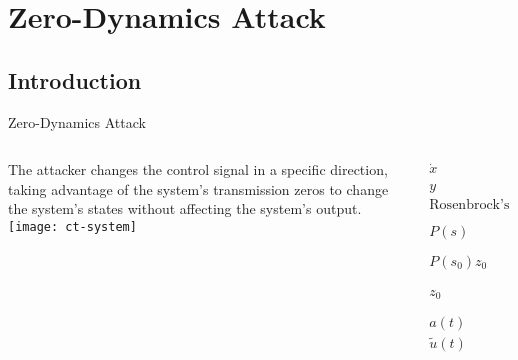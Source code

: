 
\section{Zero-Dynamics Attack}%
\label{sec:zda}

\subsection{Introduction}%
\label{subsec:ts-introduction}

\begin{slide}{Zero-Dynamics Attack}
  \begin{columns}[c]
    \begin{column}{0.48\textwidth}
      The attacker changes the control signal in a specific direction, taking
      advantage of the system's transmission zeros to change the system's states
      without affecting the system's output.
      \texttt{[image: ct-system]}
    \end{column}%
    \hfill%
    \begin{column}{0.48\textwidth}
      \begin{align}
        \dot{x}       & = Ax + Bu                                       \\
        y             & = Cx + Du                                       \\
        \textrm{Rosenbrock's Matrix:} \nonumber                         \\
        P(s)          & = \begin{bmatrix}
                            sI-A & -B \\
                            C    & D
                          \end{bmatrix},                                \\
        P(s_{0})z_{0} & = 0.                                            \\
        z_{0}         & = \begin{bmatrix} x_{0} \\ a_{0} \end{bmatrix}, \\
        a(t)          & = a_{0}e^{s_{0}t},                              \\
        \tilde{u}(t)  & =u(t) + a(t).
      \end{align}
    \end{column}%
  \end{columns}
\end{slide}

